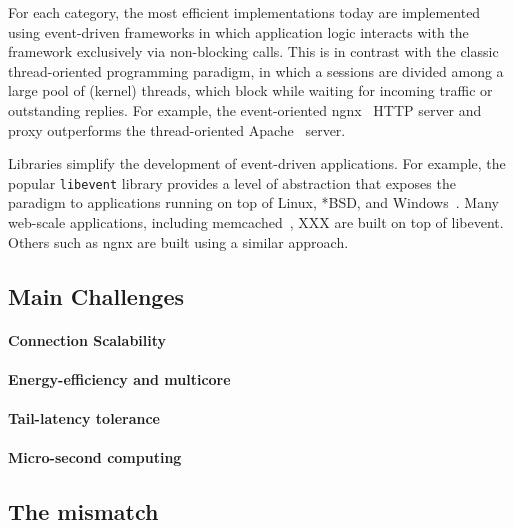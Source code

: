 For each category, the most efficient implementations today are
implemented using event-driven frameworks in which application logic
interacts with the framework exclusively via non-blocking calls.  This
is in contrast with the classic thread-oriented programming paradigm,
in which a sessions are divided among a large pool of (kernel)
threads, which block while waiting for incoming traffic or outstanding
replies.  For example, the event-oriented ngnx~\cite{missing} HTTP
server and proxy outperforms the thread-oriented Apache~\cite{missing}
server.

Libraries simplify the development of event-driven applications.  For
example, the popular \texttt{libevent} library provides a level of
abstraction that exposes the paradigm to applications running on top
of Linux, *BSD, and Windows~\cite{missing}.  Many web-scale
applications, including memcached~\cite{missing}, XXX are built on top
of libevent.  Others such as ngnx are built using a similar approach.


\subsection{Main Challenges}
\label{sec:motivation:challenges}


\paragraph{Connection Scalability}

\paragraph{Energy-efficiency and multicore}

\paragraph{Tail-latency tolerance}

\paragraph{Micro-second computing}

\subsection{The mismatch}






